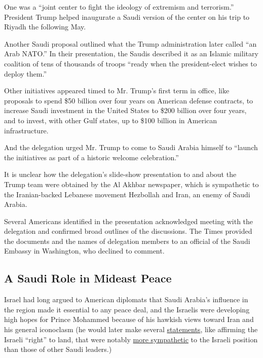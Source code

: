 One was a ``joint center to fight the ideology of extremism and
terrorism.'' President Trump helped inaugurate a Saudi version of the
center on his trip to Riyadh the following May.

Another Saudi proposal outlined what the Trump administration later
called ``an Arab NATO.'' In their presentation, the Saudis described it
as an Islamic military coalition of tens of thousands of troops ``ready
when the president-elect wishes to deploy them.''

Other initiatives appeared timed to Mr. Trump's first term in office,
like proposals to spend \$50 billion over four years on American defense
contracts, to increase Saudi investment in the United States to \$200
billion over four years, and to invest, with other Gulf states, up to
\$100 billion in American infrastructure.

And the delegation urged Mr. Trump to come to Saudi Arabia himself to
``launch the initiatives as part of a historic welcome celebration.''

It is unclear how the delegation's slide-show presentation to and about
the Trump team were obtained by the Al Akhbar newspaper, which is
sympathetic to the Iranian-backed Lebanese movement Hezbollah and Iran,
an enemy of Saudi Arabia.

Several Americans identified in the presentation acknowledged meeting
with the delegation and confirmed broad outlines of the discussions. The
Times provided the documents and the names of delegation members to an
official of the Saudi Embassy in Washington, who declined to comment.

\hypertarget{a-saudi-role-in-mideast-peace}{%
\subsection{A Saudi Role in Mideast
Peace}\label{a-saudi-role-in-mideast-peace}}

Israel had long argued to American diplomats that Saudi Arabia's
influence in the region made it essential to any peace deal, and the
Israelis were developing high hopes for Prince Mohammed because of his
hawkish views toward Iran and his general iconoclasm (he would later
make several
\href{https://www.theatlantic.com/international/archive/2018/04/mohammed-bin-salman-iran-israel/557036/}{statements},
like affirming the Israeli ``right'' to land, that were notably
\href{https://www.nytimes.com/2017/12/03/world/middleeast/palestinian-saudi-peace-plan.html}{more
sympathetic} to the Israeli position than those of other Saudi leaders.)

